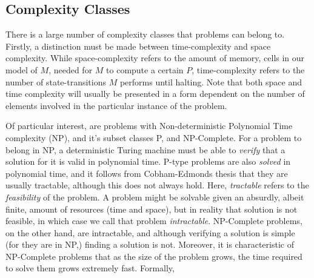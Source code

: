 \documentclass[11pt,letterpaper]{article}
\theoremstyle{definition}
\begin{document}
\subsection{Complexity Classes}
\begin{figure}
    \centering
\end{figure}
There is a large number of complexity classes that problems can belong to. Firstly, a distinction must be made between time-complexity and space complexity. While space-complexity refers to the amount of memory, cells in our model of \(M\), needed for \(M\) to compute a certain \(P\), time-complexity refers to the number of state-transitions \(M\) performs until halting. Note that both space and time complexity will usually be presented in a form dependent on the number of elements involved in the particular instance of the problem.

Of particular interest, are problems with Non-deterministic Polynomial Time complexity (NP), and it's subset classes P, and NP-Complete. For a problem to belong in NP, a deterministic Turing machine must be able to \emph{verify} that a solution for it is valid in polynomial time. P-type problems are also \emph{solved} in polynomial time, and it follows from Cobham-Edmonds thesis that they are usually tractable\autocite{cobham_1965}, although this does not always hold\autocite{goldreich_2008}. Here, \emph{tractable} refers to the \emph{feasibility} of the problem. A problem might be solvable given an absurdly, albeit finite, amount of resources (time and space), but in reality that solution is not feasible, in which case we call that problem \emph{intractable}. NP-Complete problems, on the other hand, are intractable, and although verifying a solution is simple (for they are in NP,) finding a solution is not. Moreover, it is characteristic of NP-Complete problems that as the size of the problem grows, the time required to solve them grows extremely fast.\autocite{sep-computational-complexity} Formally,
\end{document}

